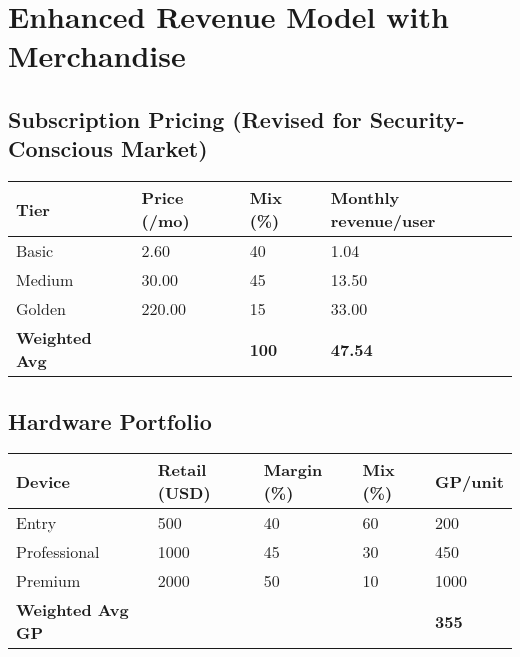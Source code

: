 \documentclass[11pt]{article}
\begin{document}
\section{Enhanced Revenue Model with Merchandise}

\subsection{Subscription Pricing (Revised for Security-Conscious Market)}
\begin{table}[htbp]
\centering
\begin{tabularx}{\linewidth}{l Y Y Y}
\toprule
Tier & Price (/mo) & Mix (\%) & Monthly revenue/user \\\midrule
Basic   & 2.60  & 40 & 1.04 \\
Medium  & 30.00 & 45 & 13.50 \\
Golden  & 220.00& 15 & 33.00 \\\midrule
\textbf{Weighted Avg} &  & \textbf{100} & \textbf{47.54} \\
\bottomrule
\end{tabularx}
\end{table}

\subsection{Hardware Portfolio}
\begin{table}[htbp]
\centering
\begin{tabularx}{\linewidth}{l Y Y Y Y}
\toprule
Device & Retail (USD) & Margin (\%) & Mix (\%) & GP/unit \\\midrule
Entry        & 500  & 40 & 60 & 200 \\
Professional & 1000 & 45 & 30 & 450 \\
Premium      & 2000 & 50 & 10 & 1000 \\\midrule
\textbf{Weighted Avg GP} &  &  &  & \textbf{355} \\
\bottomrule
\end{tabularx}
\end{table}
\end{document}
